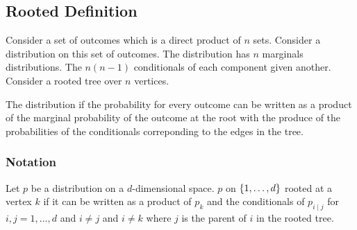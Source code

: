 
\sbasic
































\sstart
{}



\subsection{Rooted Definition}

Consider a set of outcomes which
is a direct product of $n$ sets.
Consider a distribution on this
set of outcomes.
The distribution has
$n$ marginals distributions.
The $n(n-1)$ conditionals
of each component given another.
Consider a rooted tree over $n$ vertices.

The distribution
if the probability for every outcome can
be written as a product
of the marginal probability of the outcome
at the root with the produce of the probabilities
of the conditionals correponding to the edges
in the tree.

\subsubsection{Notation}


Let $p$ be a distribution on
a $d$-dimensional space.
$p$
on $\{1, \dots, d\}$ rooted
at a vertex $k$ if it can be
written as a product of $p_k$
and the conditionals of $p_{i \mid j}$
for $i,j = 1, \dots, d$ and $i \neq j$
and $i \neq k$ where $j$ is the parent
of $i$ in the rooted tree.

